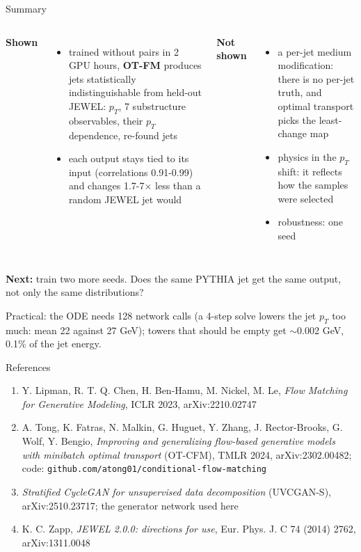 \documentclass[aspectratio=169,10pt]{beamer}
\newcommand{\ot}{\textbf{OT-FM}}
\newcommand{\smallnote}[1]{{\footnotesize\color{ink2}#1\par}}
\begin{document}
\begin{frame}{Summary}
\begin{columns}[T]
\textbf{Shown}
\begin{itemize}\setlength\itemsep{0.4em}
\item trained without pairs in 2 GPU hours, \ot{} produces jets statistically indistinguishable from
  held-out JEWEL: $p_T$, 7 substructure observables, their $p_T$ dependence, re-found jets
\item each output stays tied to its input (correlations 0.91-0.99) and changes 1.7-7$\times$ less than a
  random JEWEL jet would
\end{itemize}
\textbf{Not shown}
\begin{itemize}\setlength\itemsep{0.4em}
\item a per-jet medium modification: there is no per-jet truth, and optimal transport picks the
  least-change map
\item physics in the $p_T$ shift: it reflects how the samples were selected
\item robustness: one seed
\end{itemize}
\end{columns}
\vspace{1.2em}
\colorbox{wash}{\parbox{0.97\linewidth}{\vspace{0.4em}\hspace{0.3em}\textbf{Next:} train two more seeds.
Does the same PYTHIA jet get the same output, not only the same distributions?\vspace{0.4em}}}

\vspace{0.8em}
\smallnote{Practical: the ODE needs 128 network calls (a 4-step solve lowers the jet $p_T$ too much: mean 22 against 27 GeV); towers that
should be empty get $\sim$0.002 GeV, 0.1\% of the jet energy.}
\end{frame}

\begin{frame}{References}
\footnotesize
\begin{enumerate}\setlength\itemsep{0.5em}
\item Y. Lipman, R. T. Q. Chen, H. Ben-Hamu, M. Nickel, M. Le, \emph{Flow Matching for Generative
  Modeling}, ICLR 2023, arXiv:2210.02747
\item A. Tong, K. Fatras, N. Malkin, G. Huguet, Y. Zhang, J. Rector-Brooks, G. Wolf, Y. Bengio,
  \emph{Improving and generalizing flow-based generative models with minibatch optimal transport}
  (OT-CFM), TMLR 2024, arXiv:2302.00482; code: \texttt{github.com/atong01/conditional-flow-matching}
\item \emph{Stratified CycleGAN for unsupervised data decomposition} (UVCGAN-S), arXiv:2510.23717; the
  generator network used here
\item K. C. Zapp, \emph{JEWEL 2.0.0: directions for use}, Eur. Phys. J. C 74 (2014) 2762,
  arXiv:1311.0048
\end{enumerate}
\end{frame}
\end{document}
